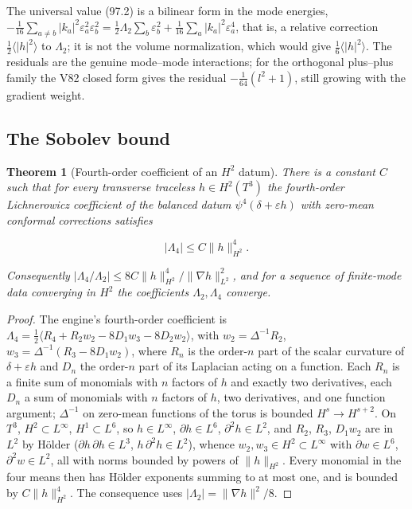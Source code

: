 \documentclass[11pt]{article}
\newtheorem{theorem}{Theorem}[section]
\theoremstyle{remark}
\begin{document}
The universal value (97.2) is a bilinear form in the mode energies,
\(-\tfrac1{16}\sum_{a\neq b}|k_a|^2\varepsilon_a^2\varepsilon_b^2=\tfrac12\Lambda_2\sum_b\varepsilon_b^2+\tfrac1{16}\sum_a|k_a|^2\varepsilon_a^4\),
that is, a relative correction \(\tfrac12\langle|h|^2\rangle\) to
\(\Lambda_2\); it is not the volume normalization, which would give
\(\tfrac16\langle|h|^2\rangle\).  The residuals are the genuine
mode--mode interactions; for the orthogonal plus--plus family the V82
closed form gives the residual \(-\tfrac1{64}(l^2+1)\), still growing
with the gradient weight.

\subsection{The Sobolev bound}

\begin{theorem}[Fourth-order coefficient of an \(H^2\) datum]
\label{thm:v19v94-sobolev}
There is a constant \(C\) such that for every transverse traceless
\(h\in H^2(T^3)\) the fourth-order Lichnerowicz coefficient of the
balanced datum \(\psi^4(\delta+\varepsilon h)\) with zero-mean
conformal corrections satisfies

\[
 |\Lambda_4|\leq C\|h\|_{H^2}^4.                                          \tag{97.4}
\]

Consequently \(|\Lambda_4/\Lambda_2|\leq8C\|h\|_{H^2}^4/\|\nabla h\|_{L^2}^2\),
and for a sequence of finite-mode data converging in \(H^2\) the
coefficients \(\Lambda_2,\Lambda_4\) converge.
\end{theorem}

\begin{proof}
The engine's fourth-order coefficient is
\(\Lambda_4=\tfrac12\langle R_4+R_2w_2-8D_1w_3-8D_2w_2\rangle\), with
\(w_2=\Delta^{-1}R_2\), \(w_3=\Delta^{-1}(R_3-8D_1w_2)\), where
\(R_n\) is the order-\(n\) part of the scalar curvature of
\(\delta+\varepsilon h\) and \(D_n\) the order-\(n\) part of its
Laplacian acting on a function.  Each \(R_n\) is a finite sum of
monomials with \(n\) factors of \(h\) and exactly two derivatives,
each \(D_n\) a sum of monomials with \(n\) factors of \(h\), two
derivatives, and one function argument; \(\Delta^{-1}\) on
zero-mean functions of the torus is bounded \(H^s\to H^{s+2}\).  On
\(T^3\), \(H^2\subset L^\infty\), \(H^1\subset L^6\), so
\(h\in L^\infty\), \(\partial h\in L^6\), \(\partial^2h\in L^2\), and
\(R_2\), \(R_3\), \(D_1w_2\) are in \(L^2\) by H\"older
(\(\partial h\,\partial h\in L^3\), \(h\,\partial^2h\in L^2\)), whence
\(w_2,w_3\in H^2\subset L^\infty\) with \(\partial w\in L^6\),
\(\partial^2w\in L^2\), all with norms bounded by powers of
\(\|h\|_{H^2}\).  Every monomial in the four means then has H\"older
exponents summing to at most one, and is bounded by
\(C\|h\|_{H^2}^4\).  The consequence uses \(|\Lambda_2|=\|\nabla h\|^2/8\).
\end{proof}
\end{document}
